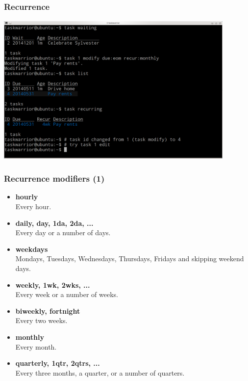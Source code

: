 \documentclass[t,handout]{beamer}
\begin{document}
\begin{frame}[fragile]\frametitle{Recurrence}
\begin{center} %
\includegraphics[width=11.8cm,height=7.5cm]{recurrence.png}
\end{center}
\end{frame}

\begin{frame}\frametitle{Recurrence modifiers (1)}
\begin{itemize}
\item \textbf{hourly} \\
Every hour.
\item \textbf{daily, day, 1da, 2da, ...} \\
Every day or a number of days.
\item \textbf{weekdays} \\
Mondays, Tuesdays, Wednesdays, Thursdays, Fridays and skipping  weekend days.
\item \textbf{weekly, 1wk, 2wks, ...} \\
Every week or a number of weeks.
\item \textbf{biweekly, fortnight} \\
Every two weeks.
\item \textbf{monthly} \\
Every month.
\item \textbf{quarterly, 1qtr, 2qtrs, ...} \\
Every three months, a quarter, or a number of quarters.
\end{itemize}
\end{frame}
\end{document}
